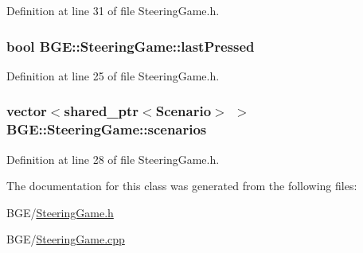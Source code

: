 Definition at line 31 of file Steering\-Game.\-h.

\hypertarget{class_b_g_e_1_1_steering_game_ad721abc4f835ee7a164e6ce8ed72f88b}{
\subsubsection[{last\-Pressed}]{\setlength{\rightskip}{0pt plus 5cm}bool B\-G\-E\-::\-Steering\-Game\-::last\-Pressed}}\label{class_b_g_e_1_1_steering_game_ad721abc4f835ee7a164e6ce8ed72f88b}


Definition at line 25 of file Steering\-Game.\-h.

\hypertarget{class_b_g_e_1_1_steering_game_a974e16b0d6fee03ac5d0e5cef9fc8643}{
\subsubsection[{scenarios}]{\setlength{\rightskip}{0pt plus 5cm}vector$<$shared\-\_\-ptr$<${\bf Scenario}$>$ $>$ B\-G\-E\-::\-Steering\-Game\-::scenarios}}\label{class_b_g_e_1_1_steering_game_a974e16b0d6fee03ac5d0e5cef9fc8643}


Definition at line 28 of file Steering\-Game.\-h.



The documentation for this class was generated from the following files\-:\begin{DoxyCompactItemize}
\item 
B\-G\-E/\hyperlink{_steering_game_8h}{Steering\-Game.\-h}\item 
B\-G\-E/\hyperlink{_steering_game_8cpp}{Steering\-Game.\-cpp}\end{DoxyCompactItemize}
